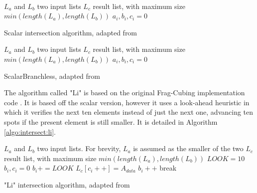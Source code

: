 ~

\begin{algorithm}[H]
\SetAlgoLined
{}
 $L_a$ and $L_b$ two input lists\;
 $L_c$ result list, with maximum size $min(length(L_a), length(L_b))$\;
 $a_i, b_i, c_i = 0$\;
 \;
 \caption{Scalar intersection algorithm, adapted from }\label{algo:intersect:scalar}
\end{algorithm}

\begin{algorithm}[H]
\SetAlgoLined
{}
 $L_a$ and $L_b$ two input lists\;
 $L_c$ result list, with maximum size $min(length(L_a), length(L_b))$\;
 $a_i, b_i, c_i = 0$\;
 \;
 \caption{ScalarBranchless, adapted from }\label{algo:intersect:scalar_branchless}
\end{algorithm}

The algorithm called "Li" is based on the original Frag-Cubing implementation code \cite{liHighdimensionalOLAPMinimal2004}.
It is based off the scalar version, however it uses a look-ahead heuristic in which it verifies the next ten elements instead of just the next one, advancing ten spots if the present element is still smaller.
It is detailed in Algorithm \ref{algo:intersect:li}.

\begin{algorithm}[H]
\SetAlgoLined
{}
 $L_a$ and $L_b$ two input lists. For brevity, $L_a$ is assumed as the smaller of the two\;
 $L_c$ result list, with maximum size $min(length(L_a), length(L_b))$\;
 $LOOK = 10$
 $b_i, c_i = 0$\;
 {
   {
     $b_i += LOOK$\;
   }
   {
     $L_c[c_i++] = A_{data}$\;
     $b_i++$\;
   }
   {
     break\;
   }
 }
 \;
 \caption{"Li" intersection algorithm, adapted from~}\label{algo:intersect:li}
\end{algorithm}

